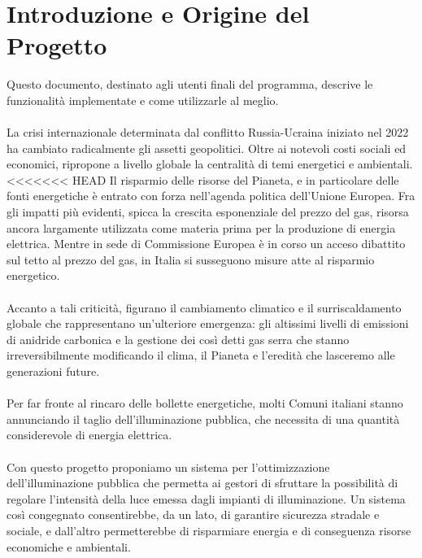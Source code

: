 \documentclass[a4paper, 12pt]{article}
\begin{document}
\makeindexdetails
\makefrontpage \makeversioni
\tableofcontents
\newpage
\clearpage
{}
\newpage
\listoffigures
\newpage
\section{Introduzione e Origine del Progetto}
Questo documento, destinato agli utenti finali del programma, descrive le funzionalità implementate e come utilizzarle al meglio.\\ \\
La crisi internazionale determinata dal conflitto Russia-Ucraina iniziato nel 2022 ha cambiato radicalmente gli assetti geopolitici. Oltre ai notevoli costi sociali ed economici, ripropone a livello globale la centralità di temi energetici e ambientali.\\
<<<<<<< HEAD
Il risparmio delle risorse del Pianeta, e in particolare delle fonti energetiche è entrato con forza nell'agenda politica dell'Unione Europea. Fra gli impatti più evidenti, spicca la crescita esponenziale del prezzo del gas, risorsa ancora largamente utilizzata come materia prima per la produzione di energia elettrica. Mentre in sede di Commissione Europea è in corso un acceso dibattito sul tetto al prezzo del gas, in Italia si susseguono misure atte al risparmio energetico.\\\\
Accanto a tali criticità, figurano il cambiamento climatico e il surriscaldamento globale che rappresentano un'ulteriore emergenza: gli altissimi livelli di emissioni di anidride carbonica e la gestione dei così detti gas serra che stanno irreversibilmente modificando il clima, il Pianeta e l'eredità che lasceremo alle generazioni future.\\\\
Per far fronte al rincaro delle bollette energetiche, molti Comuni italiani stanno annunciando il taglio dell'illuminazione pubblica, che necessita di una quantità considerevole di energia elettrica.\\\\
Con questo progetto proponiamo un sistema per l'ottimizzazione dell'illuminazione pubblica che permetta ai gestori di sfruttare la possibilità di regolare l'intensità della luce emessa dagli impianti di illuminazione. Un sistema così congegnato consentirebbe, da un lato, di garantire sicurezza stradale e sociale, e dall'altro permetterebbe di risparmiare energia e di conseguenza risorse economiche e ambientali.
\end{document}
